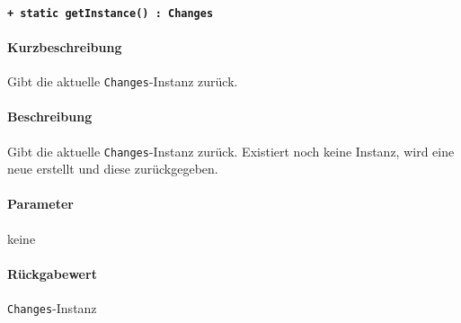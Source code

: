 \paragraph{\texttt{+ static getInstance() : Changes}}%
\paragraph*{Kurzbeschreibung}
Gibt die aktuelle \verb#Changes#-Instanz zurück.
\paragraph*{Beschreibung}
Gibt die aktuelle \verb#Changes#-Instanz zurück.
Existiert noch keine Instanz, wird eine neue erstellt und diese zurückgegeben.
\paragraph*{Parameter}
keine
\paragraph*{Rückgabewert}
\verb#Changes#-Instanz